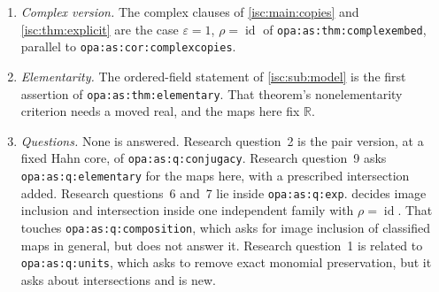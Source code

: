 \documentclass[11pt,letterpaper]{article}
\theoremstyle{definition}
\theoremstyle{remark}
\newcommand{\On}{\mathbf{On}}
\newcommand{\R}{\mathbb R}
\newcommand{\K}[2]{\mathcal K_{#1}(#2)}
\newcommand{\id}{\operatorname{id}}
\newcommand{\lbl}[1]{\nolinkurl{#1}}%
\numberwithin{equation}{section}
\begin{document}
\begin{enumerate}[leftmargin=*,itemsep=3pt]
$\On$-indexed family whose pairwise intersection is exactly the full Hahn
field $\K{\R}{H}\supseteq A\cup\R$, jointly linearly disjoint over it.
The mechanisms differ. That theorem fixes the inner supports through an
order embedding (\lbl{opa:as:lem:parameters}); here the outer exponent
group $H$ is fixed by $h_\alpha$. The topological assertions of that
theorem (closed, discrete or nondiscrete images) are not claimed here, and
that report does not study intersections.
\item \emph{Complex version.} The complex clauses of \cref{isc:main:copies}
and \cref{isc:thm:explicit} are the case $\varepsilon=1$, $\rho=\id$ of
\lbl{opa:as:thm:complexembed}, parallel to \lbl{opa:as:cor:complexcopies}.
\item \emph{Elementarity.} The ordered-field statement of \cref{isc:sub:model} is the first assertion of
\lbl{opa:as:thm:elementary}. That theorem's nonelementarity criterion
needs a moved real, and the maps here fix $\R$.
\item \emph{Questions.} None is answered. Research question~2 is the pair
version, at a fixed Hahn core, of \lbl{opa:as:q:conjugacy}. Research
question~9 asks \lbl{opa:as:q:elementary} for the maps here, with a
prescribed intersection added. Research questions~6 and~7 lie inside
\lbl{opa:as:q:exp}.  decides image inclusion and
intersection inside one independent family with $\rho=\id$. That touches
\lbl{opa:as:q:composition}, which asks for image inclusion of classified
maps in general, but does not answer it. Research question~1 is related to
\lbl{opa:as:q:units}, which asks to remove exact monomial preservation, but
it asks about intersections and is new.
\end{enumerate}
\end{document}
